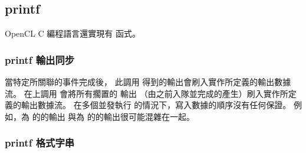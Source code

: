 \subsection{printf}

OpenCL C 編程語言還實現有  函式。

{}

\subsubsection{printf 輸出同步}

當特定所關聯的事件完成後，
此調用  得到的輸出會刷入實作所定義的輸出數據流。
在上調用  會將所有擱置的  輸出
（由之前入隊並完成的產生）刷入實作所定義的輸出數據流。
在多個並發執行  的情況下，寫入數據的順序沒有任何保證。
例如，為 的的輸出
與為 的的輸出很可能混雜在一起。

\subsubsection{printf 格式字串}

